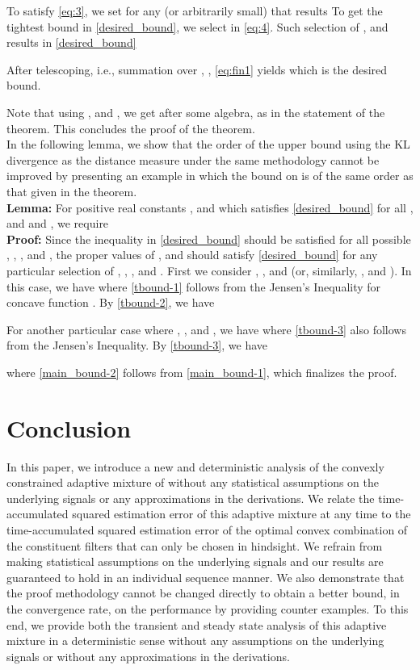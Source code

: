 \documentclass[journal]{IEEEtran}
\begin{document}
To satisfy \eqref{eq:3}, we set  for any (or
arbitrarily small)  that results
\normalsize
To get the tightest bound in \eqref{desired_bound}, we select  in \eqref{eq:4}. Such
selection of ,  and  results in \eqref{desired_bound}

\normalsize
After telescoping, i.e., summation over , ,
\eqref{eq:fin1} yields
\small
\normalsize
which is the desired bound.

Note that using ,  and , we get
\normalsize
after some algebra, as in the statement of the theorem.  This
concludes the proof of the theorem.  \\

In the following lemma, we show that the order of the upper bound
using the KL divergence as the distance measure under the same
methodology cannot be improved by presenting an example in which the
bound on  is of the same order as that given in the theorem.\\

\noindent
{\bf Lemma:} For positive real constants ,  and  which satisfies \eqref{desired_bound} for all ,  and  and , we require
\normalsize\\
\noindent
{\bf Proof:} Since the inequality in \eqref{desired_bound} should be
satisfied for all possible , , ,  and
, the proper values of ,  and  should satisfy
\eqref{desired_bound} for any particular selection of ,
, ,  and . First we consider
, ,  and  (or,
similarly, ,  and
). In this case, we have
\normalsize
where \eqref{tbound-1} follows from the Jensen's Inequality for concave function . By  \eqref{tbound-2}, we have
\normalsize

For another particular case where , ,  and , we have
\normalsize
where \eqref{tbound-3} also follows from the Jensen's Inequality. By \eqref{tbound-3}, we have

\normalsize
where \eqref{main_bound-2} follows from \eqref{main_bound-1}, which finalizes the proof. 

\section{Conclusion}
\label{sec:conclusion}
In this paper, we introduce a new and deterministic analysis of the
convexly constrained adaptive mixture of \cite{convex} without any
statistical assumptions on the underlying signals or any
approximations in the derivations. We relate the time-accumulated
squared estimation error of this adaptive mixture at any time to the
time-accumulated squared estimation error of the optimal convex
combination of the constituent filters that can only be chosen in
hindsight. We refrain from making statistical assumptions on the
underlying signals and our results are guaranteed to hold in an
individual sequence manner. We also demonstrate that the proof
methodology cannot be changed directly to obtain a better bound, in
the convergence rate, on the performance by providing counter
examples. To this end, we provide both the transient and steady state
analysis of this adaptive mixture in a deterministic sense without any
assumptions on the underlying signals or without any approximations in
the derivations.  

\end{document}
